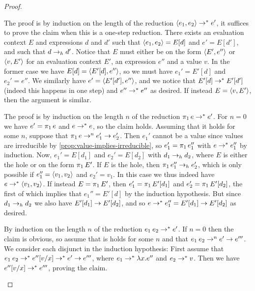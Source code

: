 \begin{proof}
\begin{proofsec*}
    \item[Proof of \itemref{enum:pair-subexpression-step}]
    The proof is by induction on the length of the reduction $\langle\textcolor{black}{e_1},\textcolor{black}{e_2}\rangle \to^* e'$, it suffices to prove the claim when this is a one-step reduction. There exists an evaluation context $E$ and expressions $d$ and $d'$ such that $\langle\textcolor{black}{e_1},\textcolor{black}{e_2}\rangle = E[d]$ and $e' = E[d']$, and such that $d \to_h d'$. Notice that $E$ must either be on the form $\langle\textcolor{black}{E'},\textcolor{black}{e''}\rangle$ or $\langle\textcolor{black}{v},\textcolor{black}{E'}\rangle$ for an evaluation context $E'$, an expression $e''$ and a value $v$. In the former case we have $E[d] = \langle\textcolor{black}{E'[d]},\textcolor{black}{e''}\rangle$, so we must have $e_1' = E'[d]$ and $e_2' = e''$. We similarly have $e' = \langle\textcolor{black}{E'[d']},\textcolor{black}{e''}\rangle$, and we notice that $E'[d] \to^* E'[d']$ (indeed this happens in one step) and $e'' \to^* e''$ as desired. If instead $E = \langle\textcolor{black}{v},\textcolor{black}{E'}\rangle$, then the argument is similar.
    
    \item[Proof of \itemref{enum:proj-subexpression-step}]
    The proof is by induction on the length $n$ of the reduction $\expProjl{e} \step^* e'$. For $n = 0$ we have $e' = \expProjl{e}$ and $e \to^* e$, so the claim holds. Assuming that it holds for some $n$, suppose that $\expProjl{e} \step^n e_1' \step e_2'$. Then $e_1'$ cannot be a value since values are irreducible by \cref{prop:value-implies-irreducible}, so $e_1' = \expProjl{e_1''}$ with $e \to^* e_1''$ by induction. Now, $e_1' = E[d_1]$ and $e_2' = E[d_2]$ with $d_1 \to_h d_2$, where $E$ is either the hole or on the form $\expProjl{E'}$. If $E$ is the hole, then $\expProjl{e_1''} \headstep e_2'$, which is only possible if $e_1'' = \langle\textcolor{black}{v_1},\textcolor{black}{v_2}\rangle$ and $e_2' = v_1$. In this case we thus indeed have $e \to^* \langle\textcolor{black}{v_1},\textcolor{black}{v_2}\rangle$. If instead $E = \expProjl{E'}$, then $e_1' = \expProjl{E'[d_1]}$ and $e_2' = \expProjl{E'[d_2]}$, the first of which implies that $e_1'' = E'[d]$ by the induction hypothesis. But since $d_1 \to_h d_2$ we also have $E'[d_1] \to E'[d_2]$, and so $e \to^* e_1'' = E'[d_1] \to E'[d_2]$ as desired.

    \item[Proof of \itemref{enum:app-subexpression-step}]
    By induction on the length $n$ of the reduction $\expApp{e_1}{e_2} \step^* e'$. If $n = 0$ then the claim is obvious, so assume that is holds for some $n$ and that $\expApp{e_1}{e_2} \step^n e' \step e'''$. We consider each disjunct in the induction hypothesis: First assume that $\expApp{e_1}{e_2} \step^* e''[v/x] \step^* e' \step e'''$, where $e_1 \step^* \expLam{x}{e''}$ and $e_2 \to^* v$. Then we have $e''[v/x] \to^* e'''$, proving the claim.
    

\end{proofsec*}
\end{proof}
